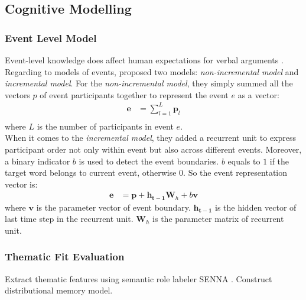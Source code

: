 \documentclass[a4paper]{article}
\begin{document}
\subsection{Cognitive Modelling}
\subsubsection{Event Level Model}
Event-level knowledge does affect human expectations for verbal arguments \citep{baroni2010distributional}. \\
\noindent 
Regarding to models of events, \citet{tilk2016event} proposed two models: \textit{non-incremental model} and \textit{incremental model}. For the \textit{non-incremental model}, they simply summed all the vectors $p$ of event participants together to represent the event $e$ as a vector:
\begin{equation} \label{eq:20}
\begin{aligned}
    \mathbf{e}
        &= \sum_{l=1}^{L} \mathbf{p}_{l} \\
\end{aligned}
\end{equation}
where $L$ is the number of participants in event $e$. \\
\noindent
When it comes to the \textit{incremental model}, they added a recurrent unit to express participant order not only within event but also across different events. Moreover, a binary indicator $b$ is used to detect the event boundaries. $b$ equals to $1$ if the target word belongs to current event, otherwise $0$. So the event representation vector is: 
\begin{equation} \label{eq:21}
\begin{aligned}
    \mathbf{e}
        &= \mathbf{p} + \mathbf{h_{t-1}}\mathbf{W}_h + b\mathbf{v}
\end{aligned}
\end{equation} 
where $\mathbf{v}$ is the parameter vector of event boundary. $\mathbf{h_{t-1}}$ is the hidden vector of last time step in the recurrent unit. $\mathbf{W}_h$ is the parameter matrix of recurrent unit. 

\subsubsection{Thematic Fit Evaluation}
\citet{sayeed2014combining} 
Extract thematic features using semantic role labeler SENNA \citep{collobert2011natural}.
Construct distributional memory model. 
\end{document}
